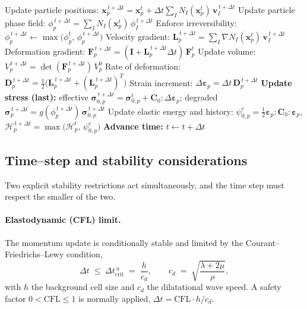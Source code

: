 \documentclass[12pt,a4paper]{article}
\newcommand{\bF}{\mathbf{F}}
\newcommand{\bI}{\mathbf{I}}
\newcommand{\bsig}{\boldsymbol{\sigma}}
\newcommand{\beps}{\boldsymbol{\varepsilon}}
\newcommand{\bv}{\mathbf{v}}
\newcommand{\bL}{\mathbf{L}}
\newcommand{\bD}{\mathbf{D}}
\newcommand{\bx}{\mathbf{x}}
\newcommand{\Cz}{\mathbf{C}_0}
\newcommand{\Dt}{\Delta t}
\begin{document}
\begin{algorithm}[H]
\begin{algorithmic}[1]
					\State Update particle positions: $\bx_p^{\,t+\Dt}=\bx_p^{t}+\Dt\sum_I N_I(\bx_p^t)\,\bv_I^{\,t+\Dt}$
					\State Update particle phase field: $\phi_p^{\,t+\Dt}=\sum_I N_I(\bx_p^t)\,\phi_I^{\,t+\Dt}$
					\State Enforce irreversibility: $\phi_p^{\,t+\Dt}\leftarrow\max\!\bigl(\phi_p^{t},\,\phi_p^{\,t+\Dt}\bigr)$
					\State Velocity gradient: $\bL_p^{\,t+\Dt}=\sum_I \nabla N_I(\bx_p^t)\,\bv_I^{\,t+\Dt}$
					\State Deformation gradient: $\bF_p^{\,t+\Dt}=(\bI+\bL_p^{\,t+\Dt}\Dt)\,\bF_p^{t}$
					\State Update volume: $V_p^{\,t+\Dt}=\det(\bF_p^{\,t+\Dt})\,V_p^0$
					\State Rate of deformation: $\bD_p^{\,t+\Dt}=\tfrac12\bigl(\bL_p^{\,t+\Dt}+(\bL_p^{\,t+\Dt})^{T}\bigr)$
					\State Strain increment: $\Delta\beps_p=\Dt\,\bD_p^{\,t+\Dt}$
					\State \textbf{Update stress (last):} effective $\bsig_{0,p}^{\,t+\Dt}=\bsig_{0,p}^{t}+\Cz:\Delta\beps_p$; degraded $\bsig_p^{\,t+\Dt}=g(\phi_p^{\,t+\Dt})\,\bsig_{0,p}^{\,t+\Dt}$
					\State Update elastic energy and history: $\psi^e_{0,p}=\tfrac12\beps_p:\Cz:\beps_p$, \;\; $\mathcal{H}_p^{\,t+\Dt}=\max\!\bigl(\mathcal{H}_p^{t},\,\psi^e_{0,p}\bigr)$
				\EndPhase
				\State \textbf{Advance time:} $t\leftarrow t+\Dt$
			\EndWhile
		\end{algorithmic}
	\end{algorithm}

	\subsection{Time--step and stability considerations}

	Two explicit stability restrictions act simultaneously, and the time step must
	respect the smaller of the two.

	\paragraph{Elastodynamic (CFL) limit.}
	The momentum update is conditionally stable and limited by the
	Courant--Friedrichs--Lewy condition,
	\begin{equation}\label{eq:cfl}
		\Dt \;\le\; \Dt_{\mathrm{crit}}^{\,u} \;=\; \frac{h}{c_d},
		\qquad
		c_d \;=\; \sqrt{\frac{\lambda+2\mu}{\rho}},
	\end{equation}
	with $h$ the background cell size and $c_d$ the dilatational wave speed. A
	safety factor $0<\mathrm{CFL}\le 1$ is normally applied,
	$\Dt=\mathrm{CFL}\cdot h/c_d$.
\end{document}
